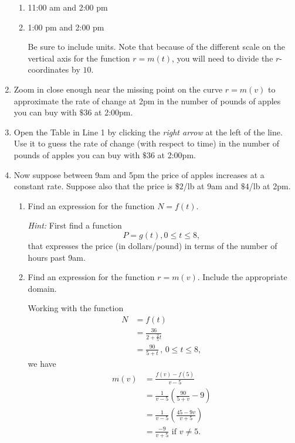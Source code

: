 \documentclass{ximera}
\begin{document}
\begin{question}
\begin{enumerate}
\begin{enumerate}
\item 11:00 am and 2:00 pm

\item 1:00 pm and 2:00 pm

Be sure to include units. Note that because of the different  scale on the vertical axis for the function $r=m(t)$, you will need to divide the $r$-coordinates by $10$.

\end{enumerate}

\item Zoom in close enough near the missing point on the curve $r=m(v)$ to approximate the rate of change at 2pm in the number of pounds of apples you can buy with $\$36$  at 2:00pm.

\item Open the Table in Line 1 by clicking the \emph{right arrow} at the left of the line. Use it to guess the rate of change (with respect to time) in the number of pounds of apples you can buy with $\$36$  at 2:00pm.

\item Now suppose between 9am and 5pm the price of apples increases at a constant rate. Suppose also that the price is $\$2$/lb at 9am and $\$4$/lb at 2pm. 

\begin{enumerate}
\item Find an expression for the function $N=f(t)$. %

\emph{Hint:} First find a function 
\[
     P = g(t), 0\leq t \leq 8,
\]
that expresses the price (in dollars/pound) in terms of the number of hours past 9am.


\item Find an expression for the function $r=m(v)$. Include the appropriate domain. %

\begin{explanation}
Working with the function
\begin{align*}
         N  &= f(t)  \\
             &= \frac{36}{2+\frac{2}{5}t}  \\
             &= \frac{90}{5+t} \, , \, 0\leq t \leq 8,
\end{align*}
we have
\begin{align*}
 m(v) &= \frac{f(v)-f(5)}{v-5} \\
         &= \frac{1}{v-5} \left(   \frac{90}{5+v} - 9   \right) \\
         &= \frac{1}{v-5} \left(   \frac{45-9v}{v+5}  \right) \\
         &= \frac{-9}{v+5} \text{ if } v\neq 5 .
\end{align*}


\end{explanation}
\end{enumerate}
\end{enumerate}
\end{question}
\end{document}
